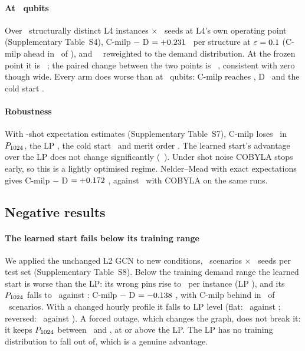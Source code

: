 \paragraph{At \NLfour\ qubits} Over \LfourNStruct\ structurally distinct L4 instances $\times$ \NSeedsLfour\ seeds at L4's own operating point (Supplementary Table~S4), C-milp $-$ D $=+0.231$ \LfourOwnCmilpMinusDTenCI\ per structure at $\varepsilon=0.1$ (C-milp ahead in \LfourOwnCmilpMinusDTenW\ of \LfourNStruct), and \LfourOwnCmilpMinusDTenRw\ \LfourOwnCmilpMinusDTenRwCI\ reweighted to the demand distribution. At the frozen point it is \LfourFrzCmilpMinusDTen\ \LfourFrzCmilpMinusDTenCI; the paired change between the two points is \LfourChangeTen\ \LfourChangeTenCI, consistent with zero though wide. Every arm does worse than at \NLtwo\ qubits: C-milp reaches \LfourOwnPgndCmilp, D \LfourOwnPgndD\ and the cold start \LfourOwnPgndA.

\label{sec:res-robust}
\paragraph{Robustness} With \ShotsMin-shot expectation estimates (Supplementary Table~S7), C-milp loses \ShotLossCmilp\ in $P_{1024}$, the LP \ShotLossD, the cold start \ShotLossA\ and merit order \ShotLossF. The learned start's advantage over the LP does not change significantly (\ShotAdvChange\ \ShotAdvChangeCI). Under shot noise COBYLA stops early, so this is a lightly optimised regime. Nelder--Mead with exact expectations gives C-milp $-$ D $=+0.172$ \NMCmilpMinusDCI, against \ExactThreeSeedCmilpMinusD\ with COBYLA on the same runs.

\subsection{Negative results}
\label{sec:res-neg}

\paragraph{The learned start fails below its training range} We applied the unchanged L2 GCN to new conditions, \OODNScen\ scenarios $\times$ \NSeedsOOD\ seeds per test set (Supplementary Table~S8). Below the training demand range the learned start is worse than the LP: its wrong pins rise to \OODLowWrongC\ per instance (LP \OODLowWrongD), and its $P_{1024}$ falls to \OODLowC\ against \OODLowD: C-milp $-$ D $=-0.138$ \OODLowDiffCI, with C-milp behind in \OODLowDiffL\ of \OODNScen\ scenarios. With a changed hourly profile it falls to LP level (flat: \OODFlatC\ against \OODFlatD; reversed: \OODRevC\ against \OODRevD). A forced outage, which changes the graph, does not break it: it keeps $P_{1024}$ between \OODOutMin\ and \OODOutMax, at or above the LP. The LP has no training distribution to fall out of, which is a genuine advantage.


